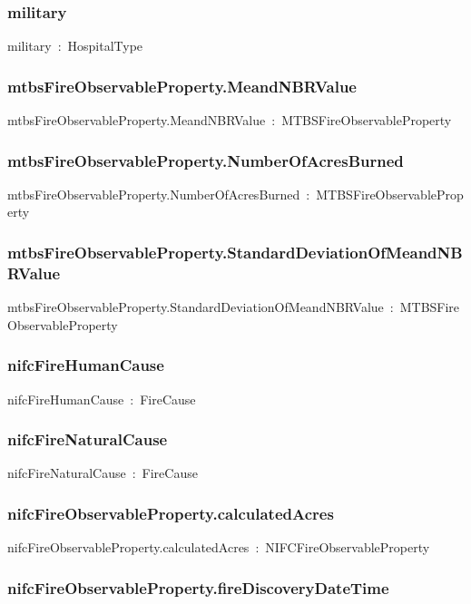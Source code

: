 \documentclass{article}
\begin{document}
\subsubsection*{military}

military~:~HospitalType

\subsubsection*{mtbsFireObservableProperty.MeandNBRValue}

mtbsFireObservableProperty.MeandNBRValue~:~MTBSFireObservableProperty

\subsubsection*{mtbsFireObservableProperty.NumberOfAcresBurned}

mtbsFireObservableProperty.NumberOfAcresBurned~:~MTBSFireObservableProperty

\subsubsection*{mtbsFireObservableProperty.StandardDeviationOfMeandNBRValue}

mtbsFireObservableProperty.StandardDeviationOfMeandNBRValue~:~MTBSFireObservableProperty

\subsubsection*{nifcFireHumanCause}

nifcFireHumanCause~:~FireCause

\subsubsection*{nifcFireNaturalCause}

nifcFireNaturalCause~:~FireCause

\subsubsection*{nifcFireObservableProperty.calculatedAcres}

nifcFireObservableProperty.calculatedAcres~:~NIFCFireObservableProperty

\subsubsection*{nifcFireObservableProperty.fireDiscoveryDateTime}
\end{document}
